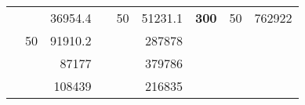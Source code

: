 \begin{table}[H]
\begin{tabular}{|ccrccrccc}
\rowcolor[HTML]{DDFDFF} 
\multicolumn{1}{|c|}{\cellcolor[HTML]{FFFFC7}}                                & \multicolumn{1}{c|}{\cellcolor[HTML]{DDFDFF}}                      & \multicolumn{1}{r|}{\cellcolor[HTML]{DAE8FC}36954.4}   & \multicolumn{1}{c|}{\cellcolor[HTML]{FFFFC7}}                                & \multicolumn{1}{c|}{\multirow{-10}{*}{\cellcolor[HTML]{DDFDFF}50}}  & \multicolumn{1}{r|}{\cellcolor[HTML]{DDFDFF}51231.1}   & \multicolumn{1}{c|}{\multirow{-19}{*}{\cellcolor[HTML]{FFFFC7}\textbf{300}}} & \multicolumn{1}{c|}{\multirow{-10}{*}{\cellcolor[HTML]{DDFDFF}50}} & \multicolumn{1}{r|}{\cellcolor[HTML]{DDFDFF}762922}    \\ \cline{3-3} \cline{5-9} 
\multicolumn{1}{|c|}{\cellcolor[HTML]{FFFFC7}}                                & \multicolumn{1}{c|}{\multirow{-10}{*}{\cellcolor[HTML]{DDFDFF}50}} & \multicolumn{1}{r|}{\cellcolor[HTML]{DDFDFF}91910.2}   & \multicolumn{1}{c|}{\cellcolor[HTML]{FFFFC7}}                                & \multicolumn{1}{c|}{\cellcolor[HTML]{DAE8FC}}                       & \multicolumn{1}{r|}{\cellcolor[HTML]{DAE8FC}287878}    &                                                                              &                                                                    &                                                        \\ \cline{2-3} \cline{6-6}
\multicolumn{1}{|c|}{\cellcolor[HTML]{FFFFC7}}                                & \multicolumn{1}{c|}{\cellcolor[HTML]{DAE8FC}}                      & \multicolumn{1}{r|}{\cellcolor[HTML]{DAE8FC}87177}     & \multicolumn{1}{c|}{\cellcolor[HTML]{FFFFC7}}                                & \multicolumn{1}{c|}{\cellcolor[HTML]{DAE8FC}}                       & \multicolumn{1}{r|}{\cellcolor[HTML]{DDFDFF}379786}    &                                                                              &                                                                    &                                                        \\ \cline{3-3} \cline{6-6}
\multicolumn{1}{|c|}{\cellcolor[HTML]{FFFFC7}}                                & \multicolumn{1}{c|}{\cellcolor[HTML]{DAE8FC}}                      & \multicolumn{1}{r|}{\cellcolor[HTML]{DDFDFF}108439}    & \multicolumn{1}{c|}{\cellcolor[HTML]{FFFFC7}}                                & \multicolumn{1}{c|}{\cellcolor[HTML]{DAE8FC}}                       & \multicolumn{1}{r|}{\cellcolor[HTML]{DAE8FC}216835}    &                                                                              &                                                                    &                                                        \\ \cline{3-3} \cline{6-6}

\end{tabular}
\end{table}
